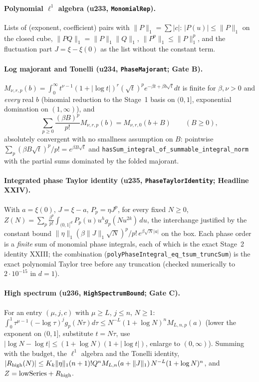 \documentclass[11pt]{article}
\begin{document}
\paragraph{Polynomial $\ell^1$ algebra (u233, \texttt{MonomialRep}).} Lists of (exponent, coefficient)
pairs with $\|P\|_1=\sum|c|$: $|P(u)|\le\|P\|_1$ on the closed cube, $\|PQ\|_1=\|P\|_1\|Q\|_1$,
$\|P^p\|_1\le\|P\|_1^p$, and the fluctuation part $J=\xi-\xi(0)$ as the list without the constant term.

\paragraph{Log majorant and Tonelli (u234, \texttt{PhaseMajorant}; Gate B).}
$M_{\nu,r,p}(b)=\int_0^\infty t^{\nu-1}(1+|\log t|)^r(\sqrt t)^pe^{-\beta t+\beta b\sqrt t}dt$ is finite for
$\beta,\nu>0$ and \emph{every} real $b$ (binomial reduction to the Stage~1 basis on $(0,1]$,
exponential domination on $(1,\infty)$), and
\[
\sum_{p\ge0}\frac{(\beta B)^p}{p!}M_{\nu,r,p}(b)=M_{\nu,r,0}(b+B)\qquad(B\ge0),
\]
absolutely convergent with no smallness assumption on $B$: pointwise $\sum_p(\beta B\sqrt t)^p/p!=e^{\beta B\sqrt t}$
and \texttt{hasSum\_integral\_of\_summable\_integral\_norm} with the partial sums dominated by the
folded majorant.

\paragraph{Integrated phase Taylor identity (u235, \texttt{PhaseTaylorIdentity}; Headline XXIV).}
With $a=\xi(0)$, $J=\xi-a$, $P_p=\eta J^p$, for every fixed $N\ge0$,
$Z(N)=\sum_p\frac{\beta^p}{p!}\int_{(0,1]^d}P_p(u)u^hg_p(Nu^{2k})\,du$, the interchange justified by the
constant bound $\|\eta\|_1(\beta\|J\|_1\sqrt N)^p/p!\,e^{\beta\sqrt N|a|}$ on the box. Each phase order is a
\emph{finite} sum of monomial phase integrals, each of which is the exact Stage~2 identity XXIII; the
combination (\texttt{polyPhaseIntegral\_eq\_tsum\_truncSum}) is the exact polynomial Taylor tree before any
truncation (checked numerically to $2\cdot10^{-15}$ in $d=1$).

\paragraph{High spectrum (u236, \texttt{HighSpectrumBound}; Gate C).} For an entry $(\mu,j,c)$ with
$\mu\ge L$, $j\le n$, $N\ge1$:
$\int_0^1\tau^{\mu-1}(-\log\tau)^jg_p(N\tau)d\tau\le N^{-L}(1+\log N)^nM_{L,n,p}(a)$ (lower the exponent
on $(0,1]$, substitute $t=N\tau$, use $|\log N-\log t|\le(1+\log N)(1+|\log t|)$, enlarge to $(0,\infty)$).
Summing with the budget, the $\ell^1$ algebra and the Tonelli identity,
$|R_{\rm high}(N)|\le K_k\|\eta\|_1(n+1)!Q^nM_{L,n}(a+\|J\|_1)\,N^{-L}(1+\log N)^n$, and
$Z=\text{lowSeries}+R_{\rm high}$.
\end{document}
